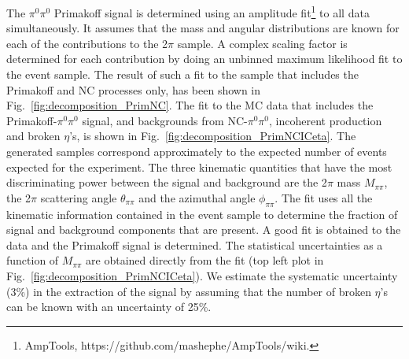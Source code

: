 The $\pi^0\pi^0$ Primakoff signal is determined using an amplitude
fit\footnote{AmpTools, https://github.com/mashephe/AmpTools/wiki.} to
all data simultaneously. It assumes that the mass and angular
distributions are known for each of the contributions to the 2$\pi$
sample. A complex scaling factor is determined for each contribution
by doing an unbinned maximum likelihood fit to the event sample. The
result of such a fit to the sample that includes the Primakoff and NC
processes only, has been shown in Fig.~\ref{fig:decomposition_PrimNC}. The
fit to the MC data that includes the Primakoff-$\pi^0\pi^0$ signal,
and backgrounds from NC-$\pi^0\pi^0$, incoherent production and broken
$\eta$'s, is shown in Fig.~\ref{fig:decomposition_PrimNCICeta}. The
generated samples correspond approximately to the expected number of
events expected for the experiment. The three kinematic quantities
that have the most discriminating power between the signal and background
are the
2$\pi$ mass $M_{\pi\pi}$, the 2$\pi$ scattering angle
$\theta_{\pi\pi}$ and the azimuthal angle $\phi_{\pi\pi}$. The fit
uses all the kinematic information contained in the event sample to
determine the fraction of signal and background components that are
present. A good fit is obtained to the data and the Primakoff signal
is determined. The statistical uncertainties as a function of
$M_{\pi\pi}$ are obtained directly from the fit (top left plot in
Fig.~\ref{fig:decomposition_PrimNCICeta}). We estimate the systematic
uncertainty (3\%) in the extraction of the signal by assuming that the
number of broken $\eta$'s can be known with an uncertainty of 25\%.

